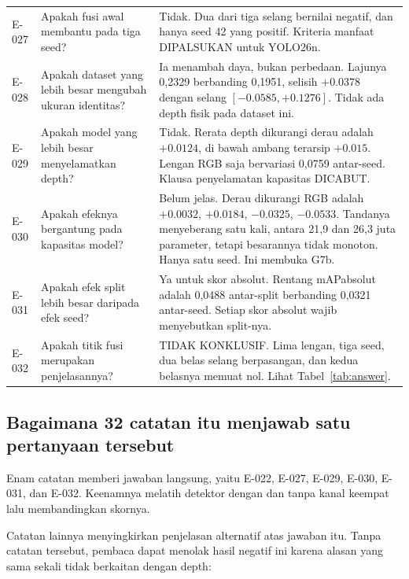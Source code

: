 \documentclass[preprint,12pt]{elsarticle}
\newcommand{\E}[1]{E-#1}
\newcommand{\G}[1]{G#1}
\newcommand{\mAP}{mAP}
\begin{document}
\begin{longtable}{L{0.07\textwidth}L{0.28\textwidth}L{0.55\textwidth}}
\E{027} & Apakah fusi awal membantu pada tiga seed? & Tidak. Dua dari tiga
selang bernilai negatif, dan hanya seed 42 yang positif. Kriteria manfaat
DIPALSUKAN untuk YOLO26n.\\

\E{028} & Apakah dataset yang lebih besar mengubah ukuran identitas? & Ia
menambah daya, bukan perbedaan. Lajunya 0,2329 berbanding 0,1951, selisih
$+0.0378$ dengan selang $[-0.0585, +0.1276]$. Tidak ada depth fisik pada dataset
ini.\\

\E{029} & Apakah model yang lebih besar menyelamatkan depth? & Tidak. Rerata
depth dikurangi derau adalah $+0.0124$, di bawah ambang terarsip $+0.015$.
Lengan RGB saja bervariasi 0,0759 antar-seed. Klausa penyelamatan kapasitas
DICABUT.\\

\E{030} & Apakah efeknya bergantung pada kapasitas model? & Belum jelas. Derau
dikurangi RGB adalah $+0.0032$, $+0.0184$, $-0.0325$, $-0.0533$. Tandanya
menyeberang satu kali, antara 21,9 dan 26,3 juta parameter, tetapi besarannya
tidak monoton. Hanya satu seed. Ini membuka \G{7b}.\\

\E{031} & Apakah efek split lebih besar daripada efek seed? & Ya untuk skor
absolut. Rentang \mAP absolut adalah 0,0488 antar-split berbanding 0,0321
antar-seed. Setiap skor absolut wajib menyebutkan split-nya.\\

\E{032} & Apakah titik fusi merupakan penjelasannya? & TIDAK KONKLUSIF. Lima
lengan, tiga seed, dua belas selang berpasangan, dan kedua belasnya memuat nol.
Lihat Tabel~\ref{tab:answer}.\\
\end{longtable}

\subsection{Bagaimana 32 catatan itu menjawab satu pertanyaan tersebut}

Enam catatan memberi jawaban langsung, yaitu \E{022}, \E{027}, \E{029},
\E{030}, \E{031}, dan \E{032}. Keenamnya melatih detektor dengan dan tanpa
kanal keempat lalu membandingkan skornya.

Catatan lainnya menyingkirkan penjelasan alternatif atas jawaban itu. Tanpa
catatan tersebut, pembaca dapat menolak hasil negatif ini karena alasan yang
sama sekali tidak berkaitan dengan depth:
\end{document}
